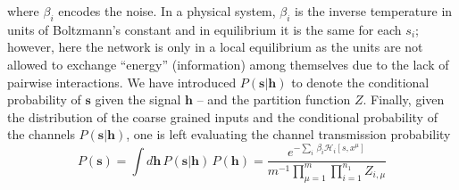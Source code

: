 \documentclass{article}
\begin{document}
where $\beta_i$ encodes the noise.  In a physical system, $\beta_i$ is the inverse temperature in units of Boltzmann's constant and in equilibrium it is the same for each $s_i$; however, here the network is only in a local equilibrium as the units are not allowed to exchange ``energy'' (information) among themselves due to the lack of pairwise interactions. We have introduced $P(\mathbf{s} | \mathbf{h})$ to denote the conditional probability of $\mathbf{s}$ given the signal $\mathbf{h}$ --  and the partition function $Z$. Finally, given the distribution of the coarse grained inputs and the conditional probability of the channels $P(\mathbf{s}|\mathbf{h})$, one is left evaluating the channel transmission probability
%
\begin{equation} \label{eq:ps3}
P(\mathbf{s}) = \int d \mathbf{h} \, P(\mathbf{s} | \mathbf{h}) \, P(\mathbf{h}) =  \frac{e^{-\sum_i \, \beta_i \mathscr{H}_i[s, x^{\mu}]}}{m^{-1}\prod_{\mu=1}^m \prod_{i=1}^{n_1} Z_{i, \mu}}   %
\end{equation}
\end{document}
